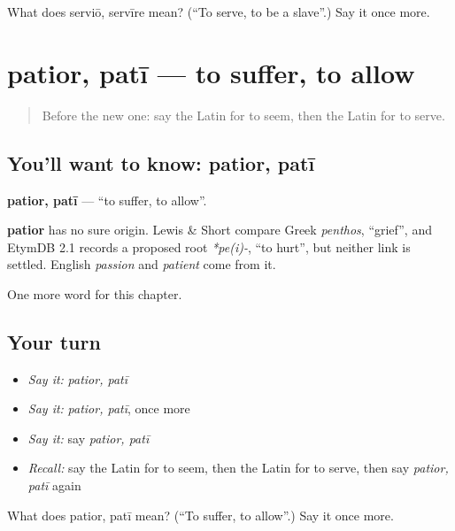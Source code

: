 \begin{tcolorbox}[breakable,colback=teal!4,colframe=teal!35!black,title={Before you move on}]
What does serviō, servīre mean? (\textquotedblleft{}To serve, to be a slave\textquotedblright{}.) Say it once more.
\end{tcolorbox}
\section[patior, patī]{patior, patī — to suffer, to allow}

\label{lesson:LA-C232-patior}



\begin{quote}
Before the new one: say the Latin for to seem, then the Latin for to serve.
\end{quote}

\subsection*{You'll want to know: patior, patī}
\textbf{patior, patī} — \textquotedblleft{}to suffer, to allow\textquotedblright{}.

\begin{cousinweb}
\textbf{patior} has no sure origin. Lewis \& Short compare Greek \emph{penthos}, \textquotedblleft{}grief\textquotedblright{}, and EtymDB 2.1 records a proposed root \emph{*pe(i)-}, \textquotedblleft{}to hurt\textquotedblright{}, but neither link is settled. English \emph{passion} and \emph{patient} come from it.
\end{cousinweb}

\begin{grammarlens}[title={What you've built}]
One more word for this chapter.
\end{grammarlens}

\subsection*{Your turn}
\begin{itemize}
\raggedright
  \item \emph{Say it:} \emph{patior, patī}
  \item \emph{Say it:} \emph{patior, patī}, once more
  \item \emph{Say it:} say \emph{patior, patī}
  \item \emph{Recall:} say the Latin for to seem, then the Latin for to serve, then say \emph{patior, patī} again
\end{itemize}

\begin{tcolorbox}[breakable,colback=teal!4,colframe=teal!35!black,title={Before you move on}]
What does patior, patī mean? (\textquotedblleft{}To suffer, to allow\textquotedblright{}.) Say it once more.
\end{tcolorbox}
